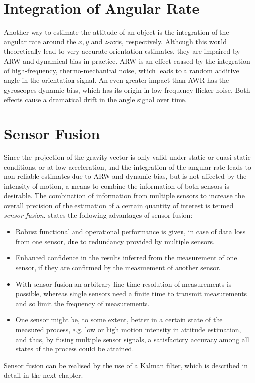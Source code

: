 \section{Integration of Angular Rate}\label{sec:integration_angular}

Another way to estimate the attitude of an object is the integration of the angular rate around the $x, y$ and $z$-axis, respectively. Although this would theoretically lead to very accurate orientation estimates, they are impaired by \gls{ARW} and dynamical bias in practice. \gls{ARW} is an effect caused by the integration of high-frequency, thermo-mechanical noise, which leads to a random additive angle in the orientation signal. An even greater impact than AWR has the gyroscopes dynamic bias, which has its origin in low-frequency flicker noise. Both effects cause a dramatical drift in the angle signal over time.

\section{Sensor Fusion}

Since the projection of the gravity vector is only valid under static or quasi-static conditions, or at low acceleration, and the integration of the angular rate leads to non-reliable estimates due to \gls{ARW} and dynamic bias, but is not affected by the intensity of motion, a means to combine the information of both sensors is desirable. The combination of information from multiple sensors to increase the overall precision of the estimation of a certain quantity of interest is termed \emph{sensor fusion}. \citeauthor{raol2009multi} \cite{raol2009multi} states the following advantages of sensor fusion:
 
\begin{itemize}
\item Robust functional and operational performance is given, in case of data loss from one sensor, due to redundancy provided by multiple sensors.
\item Enhanced confidence in the results inferred from the measurement of one sensor, if they are confirmed by the measurement of another sensor.
\item With sensor fusion an arbitrary fine time resolution of measurements is possible, whereas single sensors need a finite time to transmit measurements and so limit the frequency of measurements.
\item One sensor might be, to some extent, better in a certain state of the measured process, e.g. low or high motion intensity in attitude estimation, and thus, by fusing multiple sensor signals, a satisfactory accuracy among all states of the process could be attained.
\end{itemize}

\noindent
Sensor fusion can be realised by the use of a Kalman filter, which is described in detail in the next chapter.


